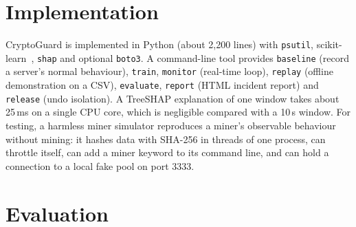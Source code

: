 \documentclass[conference]{IEEEtran}
\begin{document}
\section{Implementation}
CryptoGuard is implemented in Python (about 2,200 lines) with \texttt{psutil}, scikit-learn~\cite{pedregosa2011}, \texttt{shap} and optional \texttt{boto3}. A command-line tool provides \texttt{baseline} (record a server's normal behaviour), \texttt{train}, \texttt{monitor} (real-time loop), \texttt{replay} (offline demonstration on a CSV), \texttt{evaluate}, \texttt{report} (HTML incident report) and \texttt{release} (undo isolation). A TreeSHAP explanation of one window takes about 25\,ms on a single CPU core, which is negligible compared with a 10\,s window. For testing, a harmless miner simulator reproduces a miner's observable behaviour without mining: it hashes data with SHA-256 in threads of one process, can throttle itself, can add a miner keyword to its command line, and can hold a connection to a local fake pool on port 3333.

\section{Evaluation}
\end{document}
